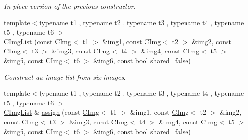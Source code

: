 \begin{DoxyCompactItemize}
\begin{DoxyCompactList}\small\item\em In-\/place version of the previous constructor. \item\end{DoxyCompactList}\item 
\hypertarget{structcimg__library_1_1_c_img_list_abccb935b6d0feba77a9a357815329818}{
{\footnotesize template$<$typename t1 , typename t2 , typename t3 , typename t4 , typename t5 , typename t6 $>$ }\\\hyperlink{structcimg__library_1_1_c_img_list_abccb935b6d0feba77a9a357815329818}{CImgList} (const \hyperlink{structcimg__library_1_1_c_img}{CImg}$<$ t1 $>$ \&img1, const \hyperlink{structcimg__library_1_1_c_img}{CImg}$<$ t2 $>$ \&img2, const \hyperlink{structcimg__library_1_1_c_img}{CImg}$<$ t3 $>$ \&img3, const \hyperlink{structcimg__library_1_1_c_img}{CImg}$<$ t4 $>$ \&img4, const \hyperlink{structcimg__library_1_1_c_img}{CImg}$<$ t5 $>$ \&img5, const \hyperlink{structcimg__library_1_1_c_img}{CImg}$<$ t6 $>$ \&img6, const bool shared=false)}
\label{structcimg__library_1_1_c_img_list_abccb935b6d0feba77a9a357815329818}

\begin{DoxyCompactList}\small\item\em Construct an image list from six images. \item\end{DoxyCompactList}\item 
\hypertarget{structcimg__library_1_1_c_img_list_a7d2951eb7dfaa357d8568660d8e554b2}{
{\footnotesize template$<$typename t1 , typename t2 , typename t3 , typename t4 , typename t5 , typename t6 $>$ }\\\hyperlink{structcimg__library_1_1_c_img_list}{CImgList} \& \hyperlink{structcimg__library_1_1_c_img_list_a7d2951eb7dfaa357d8568660d8e554b2}{assign} (const \hyperlink{structcimg__library_1_1_c_img}{CImg}$<$ t1 $>$ \&img1, const \hyperlink{structcimg__library_1_1_c_img}{CImg}$<$ t2 $>$ \&img2, const \hyperlink{structcimg__library_1_1_c_img}{CImg}$<$ t3 $>$ \&img3, const \hyperlink{structcimg__library_1_1_c_img}{CImg}$<$ t4 $>$ \&img4, const \hyperlink{structcimg__library_1_1_c_img}{CImg}$<$ t5 $>$ \&img5, const \hyperlink{structcimg__library_1_1_c_img}{CImg}$<$ t6 $>$ \&img6, const bool shared=false)}
\label{structcimg__library_1_1_c_img_list_a7d2951eb7dfaa357d8568660d8e554b2}


\end{DoxyCompactItemize}
